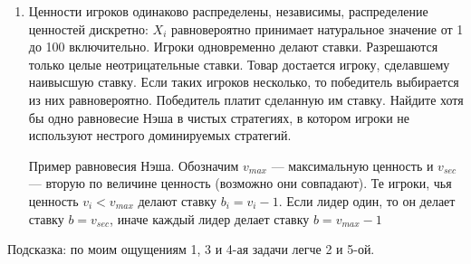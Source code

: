 \documentclass[pdftex,12pt,a4paper]{article}
\begin{document}
\begin{enumerate}
\item Ценности игроков одинаково распределены, независимы, распределение ценностей дискретно: $ X_{i}$ равновероятно принимает натуральное значение от 1 до 100 включительно. Игроки одновременно делают ставки. Разрешаются только целые неотрицательные ставки. Товар достается игроку, сделавшему наивысшую ставку. Если таких игроков несколько, то победитель выбирается из них равновероятно. Победитель платит сделанную им ставку. Найдите хотя бы одно равновесие Нэша в чистых стратегиях, в котором игроки не используют нестрого доминируемых стратегий. 



Пример равновесия Нэша. Обозначим $ v_{max} $ --- максимальную ценность и $ v_{sec} $ --- вторую по величине ценность (возможно они совпадают). Те игроки, чья ценность $ v_{i}<v_{max} $ делают ставку $ b_{i}=v_{i}-1 $. Если лидер один, то он делает ставку $ b=v_{sec} $, иначе каждый лидер делает ставку $ b=v_{max}-1 $

\end{enumerate}


Подсказка: по моим ощущениям 1, 3 и 4-ая задачи легче 2 и 5-ой.



\printindex %
\end{document}
